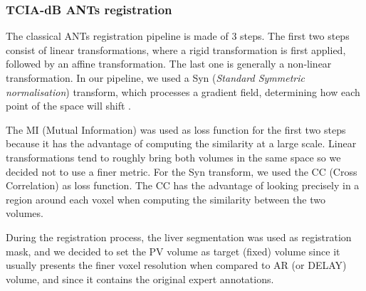 \documentclass[]{article}
\begin{document}
\subsubsection{TCIA-dB ANTs registration}\label{tcia-db-ants-registration}

The classical ANTs registration pipeline is made of 3 steps. The first
two steps consist of linear transformations, where a rigid
transformation is first applied, followed by an affine transformation.
The last one is generally a non-linear transformation. In our pipeline,
we used a Syn (\emph{Standard Symmetric normalisation}) transform, which
processes a gradient field, determining how each point of the space will
shift \cite{Avants2008}.

The MI (Mutual Information) was used as loss function for the first two
steps because it has the advantage of computing the similarity at a
large scale. Linear transformations tend to roughly bring both volumes
in the same space so we decided not to use a finer metric. For the Syn
transform, we used the CC (Cross Correlation) as loss function. The CC
has the advantage of looking precisely in a region around each voxel
when computing the similarity between the two volumes.

During the registration process, the liver segmentation was used as
registration mask, and we decided to set the PV volume as target (fixed)
volume since it usually presents the finer voxel resolution when
compared to AR (or DELAY) volume, and since it contains the original
expert annotations.
\end{document}
